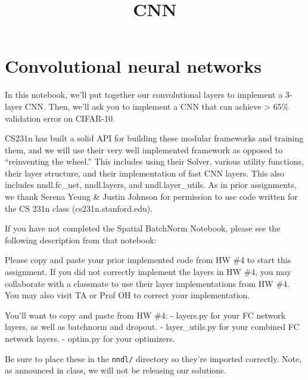 \documentclass[11pt]{article}
\title{CNN}
\begin{document}
    
    
    \maketitle
    
    

    
    \hypertarget{convolutional-neural-networks}{%
\section{Convolutional neural
networks}\label{convolutional-neural-networks}}

In this notebook, we'll put together our convolutional layers to
implement a 3-layer CNN. Then, we'll ask you to implement a CNN that can
achieve \textgreater{} 65\% validation error on CIFAR-10.

CS231n has built a solid API for building these modular frameworks and
training them, and we will use their very well implemented framework as
opposed to ``reinventing the wheel.'' This includes using their Solver,
various utility functions, their layer structure, and their
implementation of fast CNN layers. This also includes nndl.fc\_net,
nndl.layers, and nndl.layer\_utils. As in prior assignments, we thank
Serena Yeung \& Justin Johnson for permission to use code written for
the CS 231n class (cs231n.stanford.edu).

If you have not completed the Spatial BatchNorm Notebook, please see the
following description from that notebook:

Please copy and paste your prior implemented code from HW \#4 to start
this assignment. If you did not correctly implement the layers in HW
\#4, you may collaborate with a classmate to use their layer
implementations from HW \#4. You may also visit TA or Prof OH to correct
your implementation.

You'll want to copy and paste from HW \#4: - layers.py for your FC
network layers, as well as batchnorm and dropout. - layer\_utils.py for
your combined FC network layers. - optim.py for your optimizers.

Be sure to place these in the \texttt{nndl/} directory so they're
imported correctly. Note, as announced in class, we will not be
releasing our solutions.
\end{document}
